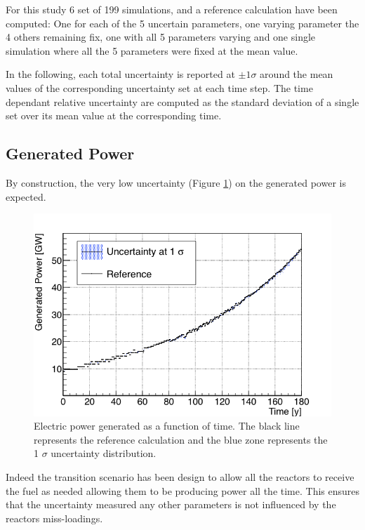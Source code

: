 \documentclass{anstrans}
\begin{document}
For this study 6 set of 199 simulations, and a reference calculation have been
computed: One for each of the 5 uncertain parameters, one varying parameter the
4 others remaining fix, one with all 5 parameters varying and one single
simulation where all the 5 parameters were fixed at the mean value. 

In the following, each total uncertainty is reported at $\pm1\sigma$ around the
mean values of the corresponding uncertainty set at each time step. The time
dependant relative uncertainty are computed as the standard deviation of a
single set over its mean value at the corresponding time.


\subsection{Generated Power}

By construction, the very low uncertainty (Figure \ref{fig:power_full}) on the
generated power is expected.

\begin{figure}[h!] %
    \centering
    \includegraphics[scale=0.35]{power_full}
    \caption{Electric power generated as a function of time.  The black line
        represents the reference calculation and the blue zone
        represents the 1 $\sigma$ uncertainty distribution.}\label{fig:power_full}
\end{figure}

Indeed the transition scenario has been design to allow all the reactors to
receive the fuel as needed allowing them to be producing power all the time.
This ensures that the uncertainty measured any other parameters is not
influenced by the reactors miss-loadings.
\end{document}
